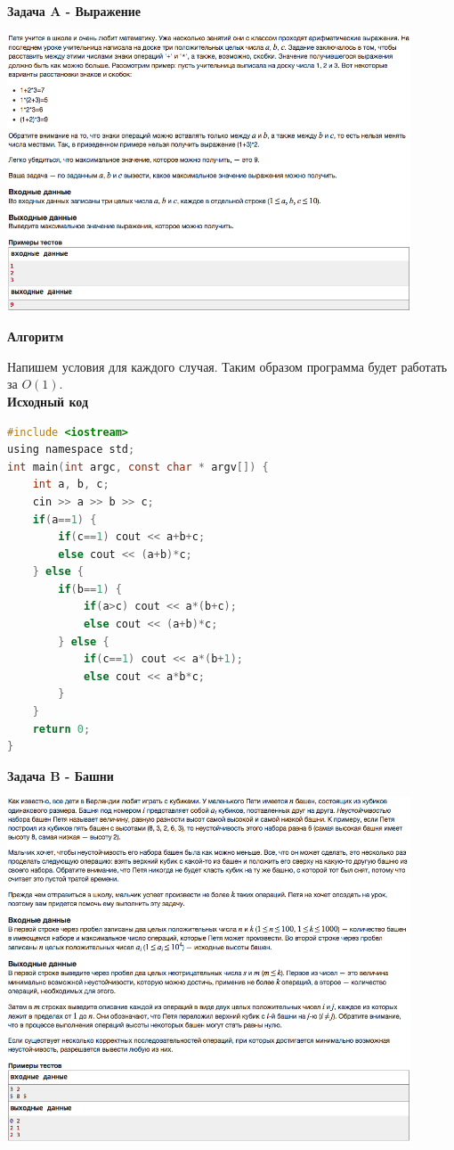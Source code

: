 \documentclass[a4paper,12pt]{article}
\begin{document}
\newpage
\textbf{{\large Задача A - Выражение}} \\
\begin{center}
\includegraphics[width=0.9\textwidth]{C_274/C_274_A.png}\\ [1cm]
\end{center}

\textbf{{\large Алгоритм}}

Напишем условия для каждого случая. Таким образом программа будет работать за $O(1)$.\\

\textbf{{\large Исходный код}} \\
\begin{lstlisting}[language=C]
#include <iostream>
using namespace std;
int main(int argc, const char * argv[]) {
    int a, b, c;
    cin >> a >> b >> c;
    if(a==1) {
        if(c==1) cout << a+b+c;
        else cout << (a+b)*c;
    } else {
        if(b==1) {
            if(a>c) cout << a*(b+c);
            else cout << (a+b)*c;
        } else {
            if(c==1) cout << a*(b+1);
            else cout << a*b*c;
        }
    }
    return 0;
}
\end{lstlisting}

\newpage
\textbf{{\large Задача B - Башни}} \\
\begin{center}
\includegraphics[width=0.9\textwidth]{C_274/C_274_B.png}\\ [1cm]
\end{center}
\end{document}
